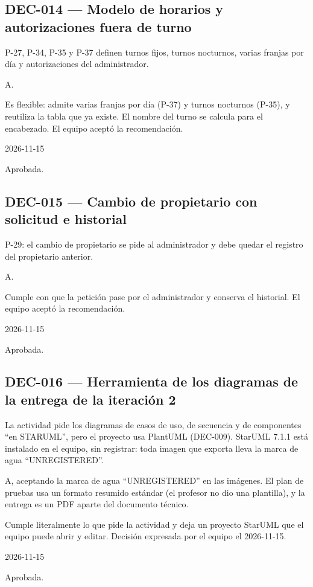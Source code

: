 \subsection{DEC-014 — Modelo de horarios y autorizaciones fuera de turno}
\begin{description}[style=nextline]
  \item[Problema] P-27, P-34, P-35 y P-37 definen turnos fijos, turnos nocturnos, varias franjas por día y autorizaciones del administrador.
  \item[Decisión seleccionada] A.
  \item[Justificación] Es flexible: admite varias franjas por día (P-37) y turnos nocturnos (P-35), y reutiliza la tabla que ya existe. El nombre del turno se calcula para el encabezado. El equipo aceptó la recomendación.
  \item[Fecha] 2026-11-15
  \item[Estado] Aprobada.
\end{description}
\subsection{DEC-015 — Cambio de propietario con solicitud e historial}
\begin{description}[style=nextline]
  \item[Problema] P-29: el cambio de propietario se pide al administrador y debe quedar el registro del propietario anterior.
  \item[Decisión seleccionada] A.
  \item[Justificación] Cumple con que la petición pase por el administrador y conserva el historial. El equipo aceptó la recomendación.
  \item[Fecha] 2026-11-15
  \item[Estado] Aprobada.
\end{description}
\subsection{DEC-016 — Herramienta de los diagramas de la entrega de la iteración 2}
\begin{description}[style=nextline]
  \item[Problema] La actividad pide los diagramas de casos de uso, de secuencia y de componentes ``en STARUML'', pero el proyecto usa PlantUML (DEC-009). StarUML 7.1.1 está instalado en el equipo, sin registrar: toda imagen que exporta lleva la marca de agua ``UNREGISTERED''.
  \item[Decisión seleccionada] A, aceptando la marca de agua ``UNREGISTERED'' en las imágenes. El plan de pruebas usa un formato resumido estándar (el profesor no dio una plantilla), y la entrega es un PDF aparte del documento técnico.
  \item[Justificación] Cumple literalmente lo que pide la actividad y deja un proyecto StarUML que el equipo puede abrir y editar. Decisión expresada por el equipo el 2026-11-15.
  \item[Fecha] 2026-11-15
  \item[Estado] Aprobada.
\end{description}